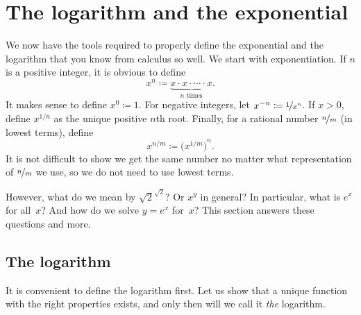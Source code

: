 
\sectionnewpage
\section{The logarithm and the exponential}
\label{sec:logandexp}



We now have the tools required to properly define the exponential
and the
logarithm that you know from calculus so well.  We start with
exponentiation.
If $n$ is a positive integer, it is obvious to define
\begin{equation*}
x^n \coloneqq \underbrace{x \cdot x \cdot \cdots \cdot x}_{n \text{ times}} .
\end{equation*}
It makes sense to define $x^0 \coloneqq 1$.
For negative integers, let $x^{-n} \coloneqq \nicefrac{1}{x^n}$.
If $x > 0$, define
$x^{1/n}$ as
the unique positive $n$th root.  Finally, for a rational
number $\nicefrac{n}{m}$ (in lowest terms), define
\begin{equation*}
x^{n/m} \coloneqq {\bigl(x^{1/m}\bigr)}^n .
\end{equation*}
It is not difficult to show 
we get the same number no matter what
representation of $\nicefrac{n}{m}$ we use, so we do not need to use
lowest terms.

However, what do we mean by $\sqrt{2}^{\sqrt{2}}$?  Or
$x^y$ in general?  In particular, what is $e^x$ for all~$x$?
And how do we solve $y=e^x$ for~$x$?
This section answers these questions and more.

\subsection{The logarithm}

It is convenient to define the logarithm first.
Let us show that
a unique function with the right properties exists, and only then will
we call it \emph{the} logarithm.


